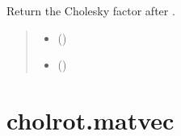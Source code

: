 \documentclass[a4paper,11pt,english]{sphinxmanual}
\begin{document}
\begin{fulllineitems}
\label{\detokenize{generated/cholrot.downdate:cholrot.downdate}}
\pysigstartsignatures
\pysiglinewithargsret
{}
{\sphinxparamcomma {}\sphinxparamcomma {}}
{}
\pysigstopsignatures
\sphinxAtStartPar
Return the Cholesky factor after .
\begin{quote}\begin{description}
\begin{itemize}
\item {} 
\sphinxAtStartPar
{} ()

\item {} 
\sphinxAtStartPar
{} ()

\end{itemize}

\sphinxAtStartPar
{}

\end{description}\end{quote}

\end{fulllineitems}


\sphinxstepscope


\section{cholrot.matvec}
\label{\detokenize{generated/cholrot.matvec:cholrot-matvec}}\label{\detokenize{generated/cholrot.matvec::doc}}
\end{document}
